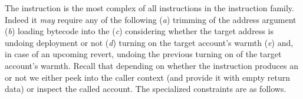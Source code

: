 
\begin{center}
\end{center}
The  instruction is the most complex of all instructions in the  instruction family.
Indeed it \emph{may} require any of the following
(\emph{a}) trimming of the address argument
(\emph{b}) loading bytecode into the \romMod{}
(\emph{c}) considering whether the target address is undoing deployment or not
(\emph{d}) turning on the target account's warmth
(\emph{e}) and, in case of an upcoming revert, undoing the previous turning on of the target account's warmth.
Recall that depending on whether the instruction produces an \mxpxSH{} or not we either peek into the caller context (and provide it with empty return data)
or inspect the called account. The specialized constraints are as follows.
